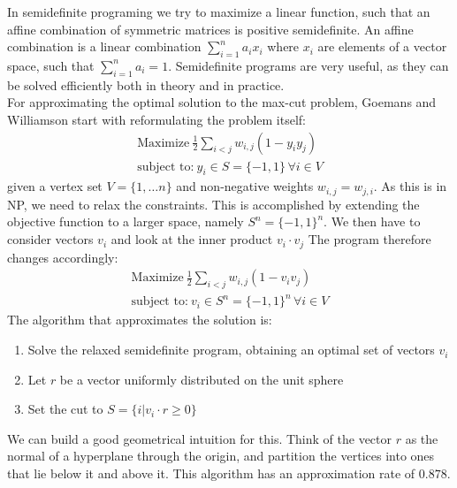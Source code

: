 In semidefinite programing we try to maximize a linear function, such that an affine combination of symmetric matrices is positive semidefinite. \cite{vandenberghe96}
An affine combination is a linear combination $\sum_{i=1}^{n}a_ix_i$ where $x_i$ are elements of a vector space, such that $\sum_{i=1}^{n}a_i=1$.
Semidefinite programs are very useful, as they can be solved efficiently both in theory and in practice.\\
For approximating the optimal solution to the max-cut problem, Goemans and Williamson \cite{goemans95} start with reformulating the problem itself: \begin{align*}
	\text{Maximize}\ \frac{1}{2}\sum_{i<j} w_{i,j}\left( 1-y_iy_j \right) \\
	\text{subject to:}\ y_i \in S=\{-1,1\}\, \forall i \in V
\end{align*}
given a vertex set $ V=\{1,\ldots n\} $ and non-negative weights $w_{i,j}=w_{j,i}$.
As this is in NP, we need to relax the constraints.
This is accomplished by extending the objective function to a larger space, namely $S^n= \{-1,1\}^n$.
We then have to consider vectors $v_i$ and look at the inner product  $v_i\cdot v_j$
The program therefore changes accordingly:
 \begin{align*}
	\label{eq:}
	\text{Maximize}\ \frac{1}{2}\sum_{i<j} w_{i,j}\left( 1-v_iv_j \right) \\
	\text{subject to:}\ v_i \in S^n=\{-1,1\}^n\, \forall i \in V
\end{align*}
The algorithm that approximates the solution is:
\begin{enumerate}
	\item Solve the relaxed semidefinite program, obtaining an optimal set of vectors $v_i$
	\item Let $r$ be a vector uniformly distributed on the unit sphere
	\item Set the cut to $S=\{i|v_i\cdot r \ge 0\} $
\end{enumerate}
We can build a good geometrical intuition for this.
Think of the vector $r$ as the normal of a hyperplane through the origin, and partition the vertices into ones that lie below it and above it.
This algorithm has an approximation rate of $0.878$.
